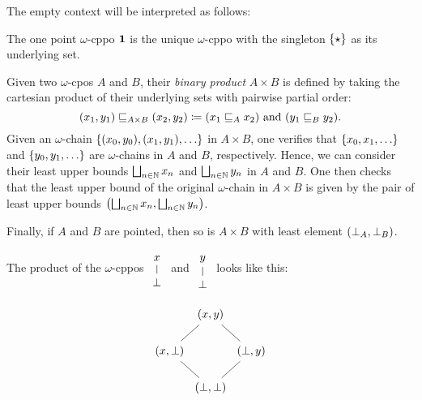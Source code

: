 The empty context will be interpreted as follows:

\begin{example}\label{exam:one-point}
  The one point \(\omega\)-cppo \(\One\) is the unique \(\omega\)-cppo with the
  singleton \(\set{\star}\) as its underlying set.
\end{example}

\begin{definition}
  Given two \(\omega\)-cpos \(A\) and \(B\), their \emph{binary product}
  \(A \times B\) is defined by taking the cartesian product of their underlying
  sets with pairwise partial order:
  \[
    (x_1 , y_1) \below_{A \times B} (x_2 , y_2) %
    \coloneqq (x_1 \below_A x_2) \text{ and } (y_1 \below_B y_2).
  \]
  Given an \(\omega\)-chain \(\set{(x_0,y_0),(x_1,y_1),\dots}\) in
  \(A \times B\), one verifies that \(\set{x_0,x_1,\dots}\) and
  \(\set{y_0,y_1,\dots}\) are \(\omega\)-chains in \(A\) and \(B\),
  respectively.
  Hence, we can consider their least upper bounds \(\bigsqcup_{n \in \Nat}x_n\)
  and \(\bigsqcup_{n \in \Nat}y_n\) in \(A\) and \(B\).
  One then checks that the least upper bound of the original \(\omega\)-chain in
  \(A \times B\) is given by the pair of least upper bounds
  \(\pa*{\bigsqcup_{n \in \Nat}x_n , \bigsqcup_{n \in \Nat}y_n}\).

  Finally, if \(A\) and \(B\) are pointed, then so is \(A \times B\) with least
  element \(\pa*{\bot_A , \bot_B}\).
\end{definition}

\begin{example}
  The product of the \(\omega\)-cppos %
  \(\begin{tikzcd}[row sep=8pt]
    x \\
    \bot \ar[u, no head]
  \end{tikzcd}\)
  and \( \begin{tikzcd}[row sep=8pt]
    y \\
    \bot \ar[u, no head]
  \end{tikzcd}
  \) looks like this:

  \[
    \begin{tikzcd}[row sep=15pt,column sep=1pt]
      & (x,y) \\
      (x,\bot) \ar[ur, no head]& & (\bot,y) \ar[ul, no head] \\
      & (\bot,\bot) \ar[ur,no head] \ar[ul, no head]
    \end{tikzcd}
  \]
\end{example}

